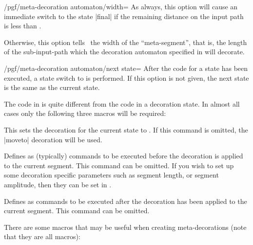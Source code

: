 \begin{command}{\pgfdeclaremetadecorate{}}
\begin{command}{\state{}}
    \begin{key}{/pgf/meta-decoration automaton/width=}
      As always, this option will cause an immediate switch to the
      state |final| if the remaining distance on the input path is less than
      .

      Otherwise, this option tells \pgfname\ the width of the
      ``meta-segment'', that is, the length of the sub-input-path
      which the decoration automaton specified  in  will decorate.
    \end{key}

    \begin{key}{/pgf/meta-decoration automaton/next state=}
      After the code for a state has been executed, a state switch to
       is performed. If this option is not given, the
      next state is the same as the current state.
    \end{key}

    The code in  is quite different from the code in a
    decoration state. In almost all cases only the following three
    macros will be required:

    \begin{command}{\decoration{}}
      This sets the decoration for the current state to .
      If this command is omitted, the |moveto| decoration will be
      used.
    \end{command}

    \begin{command}{\beforedecoration{}}
      Defines  as (typically) \pgfname{} commands to be
      executed before the decoration is applied to the current segment.
      This command can be omitted.
      If you wish to set up some decoration specific parameters
      such as segment length, or segment amplitude, then they
      can be set in .
    \end{command}

    \begin{command}{\afterdecoration{}}
      Defines  as commands to be executed after the
      decoration has been applied to the current segment.
      This command can be omitted.
    \end{command}

    There are some macros that may be useful when creating
    meta-decorations (note that they are all macros):


\end{command}
\end{command}
